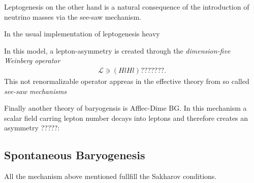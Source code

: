 \documentclass[13pt,a4paper,twoside,titlepage]{article}
\begin{document}
\noindent
Leptogenesis on the other hand is a natural consequence of the introduction of neutrino masses via the see-saw mechanism.

In the usual implementation of leptogenesis heavy


In this model, a lepton-asymmetry is created through the \emph{dimension-five Weinberg operator}
\begin{align}
    \mathcal{L} \ni (H l H l) ???????.
\end{align}
This not renormalizable operator appreas in the effective theory from so called \emph{see-saw mechanisms}


Finally another theory of baryogensis is Afflec-Dime BG. In this mechanism a scalar field carring lepton number decays into leptons and therefore creates an asymmetry ?????:

\subsection{Spontaneous Baryogenesis}
\label{sec:spontaneour_bayrogenesis}

All the mechanism above mentioned fullfill the Sakharov conditions.
\end{document}
